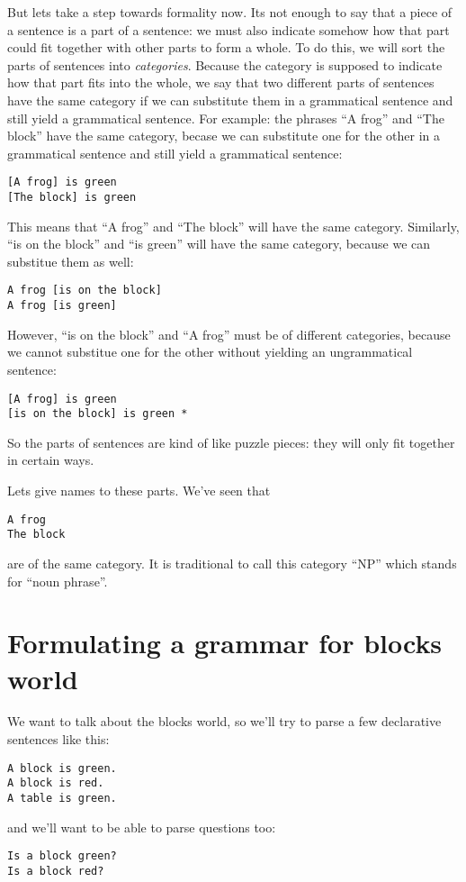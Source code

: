 \documentclass{book}[9pt]
\begin{document}
But lets take a step towards formality now.  Its not enough to say
that a piece of a sentence is a part of a sentence: we must also
indicate somehow how that part could fit together with other parts
to form a whole.  To do this, we will sort the parts of sentences into
{\em categories}.  Because the category is supposed to indicate how
that part fits into the whole, we say that two different parts of
sentences have the same category if we can substitute them in a
grammatical sentence and still yield a grammatical sentence.  For
example: the phrases ``A frog'' and ``The block'' have the same
category, becase we can substitute one for the other in a grammatical
sentence and still yield a grammatical sentence:

\begin{verbatim}
[A frog] is green
[The block] is green
\end{verbatim}
\noindent This means that ``A frog'' and ``The block'' will have the
same category.  Similarly, ``is on the block'' and ``is green'' will
have the same category, because we can substitue them as well:
\begin{verbatim}
A frog [is on the block]
A frog [is green]
\end{verbatim}

\noindent However, ``is on the block'' and ``A frog'' must be of
different categories, because we cannot substitue one for the other
without yielding an ungrammatical sentence:

\begin{verbatim}
[A frog] is green 
[is on the block] is green *
\end{verbatim}
\noindent So the parts of sentences are kind of like puzzle pieces:
they will only fit together in certain ways.

Lets give names to these parts.  We've seen that 
\begin{verbatim}
A frog
The block
\end{verbatim}
\noindent are of the same category.  It is traditional to call this
category ``NP'' which stands for ``noun phrase''. 

\section{Formulating a grammar for blocks world}

We want to talk about the blocks world, so we'll try to parse a few
declarative sentences like this:

\begin{verbatim}
A block is green.
A block is red.
A table is green.
\end{verbatim}
\noindent and we'll want to be able to parse questions too:
\begin{verbatim}
Is a block green?
Is a block red?
\end{verbatim}
\end{document}
